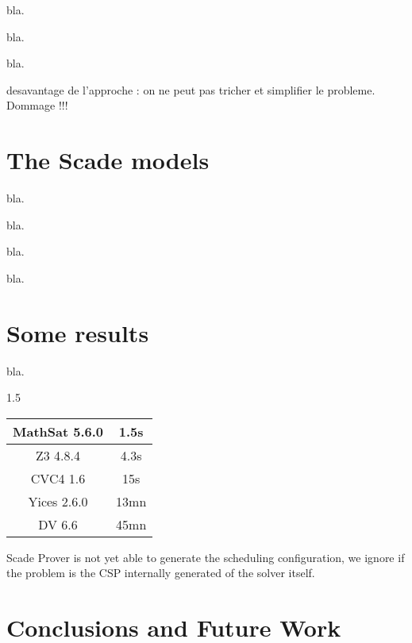 \documentclass[a4paper]{article}
\begin{document}
bla.



bla.



bla.



desavantage de l'approche : on ne peut pas tricher et simplifier le probleme. Dommage !!!



\section{The Scade models}

bla.


bla.


bla.



bla.

\section{Some results}

bla.

   1.5


\begin{tabular}{|c|c|}
\hline
MathSat 5.6.0  & 1.5s \\
\hline
Z3 4.8.4 & 4.3s \\
\hline
CVC4 1.6 & 15s \\
\hline
Yices 2.6.0 & 13mn \\
\hline
DV 6.6 & 45mn \\
\hline
\end{tabular}

Scade Prover is not yet able to generate the scheduling configuration,
we ignore if the problem is the CSP internally generated of the solver itself.

\section{Conclusions and Future Work}
\end{document}
